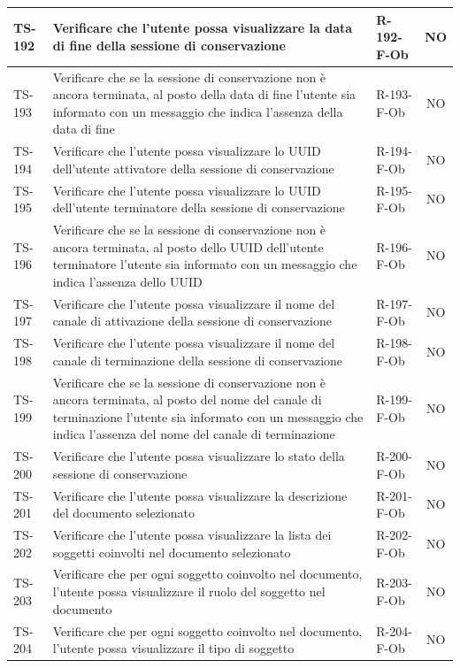 \documentclass[a4paper,12pt]{article}
\begin{document}
\begin{longtable}{|p{1.5cm}|p{8.3cm}|p{2.4cm}|c|}
\hline
TS-192 & Verificare che l'utente possa visualizzare la data di fine della sessione di conservazione & R-192-F-Ob & NO \\
\hline
TS-193 & Verificare che se la sessione di conservazione non è ancora terminata, al posto della data di fine l'utente sia informato con un messaggio che indica l'assenza della data di fine & R-193-F-Ob & NO \\
\hline
TS-194 & Verificare che l'utente possa visualizzare lo UUID dell'utente attivatore della sessione di conservazione & R-194-F-Ob & NO \\
\hline
TS-195 & Verificare che l'utente possa visualizzare lo UUID dell'utente terminatore della sessione di conservazione & R-195-F-Ob & NO \\
\hline
TS-196 & Verificare che se la sessione di conservazione non è ancora terminata, al posto dello UUID dell'utente terminatore l'utente sia informato con un messaggio che indica l'assenza dello UUID & R-196-F-Ob & NO \\
\hline
TS-197 & Verificare che l'utente possa visualizzare il nome del canale di attivazione della sessione di conservazione & R-197-F-Ob & NO \\
\hline
TS-198 & Verificare che l'utente possa visualizzare il nome del canale di terminazione della sessione di conservazione & R-198-F-Ob & NO \\
\hline
TS-199 & Verificare che se la sessione di conservazione non è ancora terminata, al posto del nome del canale di terminazione l'utente sia informato con un messaggio che indica l'assenza del nome del canale di terminazione & R-199-F-Ob & NO \\
\hline
TS-200 & Verificare che l'utente possa visualizzare lo stato della sessione di conservazione & R-200-F-Ob & NO \\
\hline
TS-201 & Verificare che l'utente possa visualizzare la descrizione del documento selezionato & R-201-F-Ob & NO \\
\hline
TS-202 & Verificare che l'utente possa visualizzare la lista dei soggetti coinvolti nel documento selezionato & R-202-F-Ob & NO \\
\hline
TS-203 & Verificare che per ogni soggetto coinvolto nel documento, l'utente possa visualizzare il ruolo del soggetto nel documento & R-203-F-Ob & NO \\
\hline
TS-204 & Verificare che per ogni soggetto coinvolto nel documento, l'utente possa visualizzare il tipo di soggetto & R-204-F-Ob & NO \\

\end{longtable}
\end{document}

